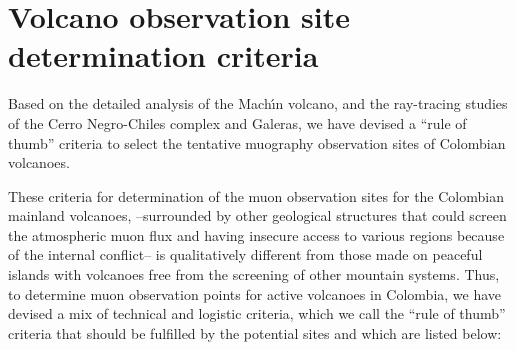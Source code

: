 \documentclass[letterpaper,10pt,titlepage,linenumber]{article}
\begin{document}
\section{Volcano observation site determination criteria}
\label{sec:Criteria}
Based on the detailed analysis of the Mach\'{\i}n volcano, and the ray-tracing studies of the Cerro Negro-Chiles complex and Galeras, we have devised a ``rule of thumb'' criteria to select the tentative muography observation sites of Colombian volcanoes.

These criteria for determination of the muon observation sites for the Colombian mainland volcanoes, --surrounded by other geological structures that could screen the atmospheric muon flux and having insecure access to various regions because of the internal conflict-- is qualitatively different from those made on peaceful islands with volcanoes free from the screening of other mountain systems. Thus, to determine muon observation points for active volcanoes in Colombia, we have devised a mix of technical and logistic criteria, which we call the ``rule of thumb''  criteria that should be fulfilled by the potential sites and which are listed below:  
\end{document}
